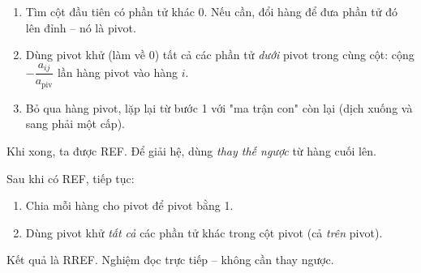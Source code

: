 \documentclass[12pt,a4paper]{article}
\begin{document}
\begin{phuongphap}[title={Khử Gauss (đưa về REF)}]
\begin{enumerate}
  \item Tìm cột đầu tiên có phần tử khác 0. Nếu cần, đổi hàng để đưa phần tử đó lên đỉnh -- nó là pivot.
  \item Dùng pivot khử (làm về 0) tất cả các phần tử \emph{dưới} pivot trong cùng cột: cộng $-\dfrac{a_{ij}}{a_{\text{piv}}}$ lần hàng pivot vào hàng $i$.
  \item Bỏ qua hàng pivot, lặp lại từ bước 1 với "ma trận con" còn lại (dịch xuống và sang phải một cấp).
\end{enumerate}
Khi xong, ta được REF. Để giải hệ, dùng \emph{thay thế ngược} từ hàng cuối lên.
\end{phuongphap}

\begin{phuongphap}[title={Gauss-Jordan (đưa về RREF)}]
Sau khi có REF, tiếp tục:
\begin{enumerate}
  \item Chia mỗi hàng cho pivot để pivot bằng 1.
  \item Dùng pivot khử \emph{tất cả} các phần tử khác trong cột pivot (cả \emph{trên} pivot).
\end{enumerate}
Kết quả là RREF. Nghiệm đọc trực tiếp -- không cần thay ngược.
\end{phuongphap}
\end{document}
